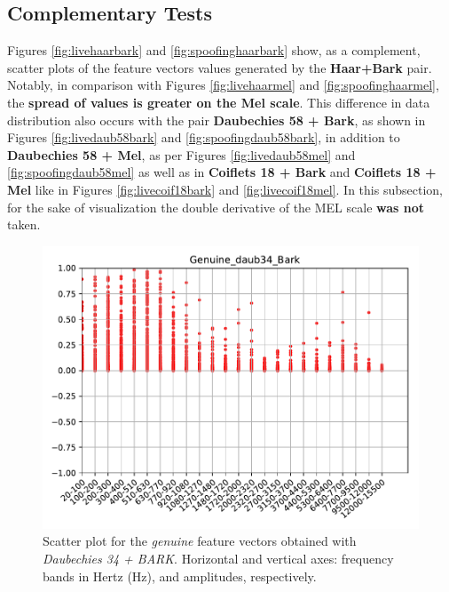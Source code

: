 	\subsection{Complementary Tests}
		\par Figures \ref{fig:livehaarbark} and \ref{fig:spoofinghaarbark} show, as a complement, scatter plots of the feature vectors values generated by the \textbf{Haar+Bark} pair. Notably, in comparison with Figures \ref{fig:livehaarmel} and \ref{fig:spoofinghaarmel}, the \textbf{spread of values is greater on the Mel scale}. This difference in data distribution also occurs with the pair \textbf{Daubechies 58 + Bark}, as shown in Figures \ref{fig:livedaub58bark} and \ref{fig:spoofingdaub58bark}, in addition to \textbf{Daubechies 58 + Mel}, as per Figures \ref{fig:livedaub58mel} and \ref{fig:spoofingdaub58mel} as well as in \textbf{Coiflets 18 + Bark} and \textbf{Coiflets 18 + Mel} like in Figures \ref{fig:livecoif18bark} and \ref{fig:livecoif18mel}. In this subsection, for the sake of visualization the double derivative of the MEL scale \textbf{was not} taken.
		\\
		\begin{figure}[H]
			\centering
			\includegraphics[scale=.7]{images/results/barkVersusMel/Genuine_daub34_Bark.pdf}
			\caption{Scatter plot for the \textit{genuine} feature vectors obtained with \textit{Daubechies 34 + BARK}. Horizontal and vertical axes: frequency bands in Hertz (Hz), and amplitudes, respectively.}
			\label{fig:livedaub34bark}
		\end{figure}
